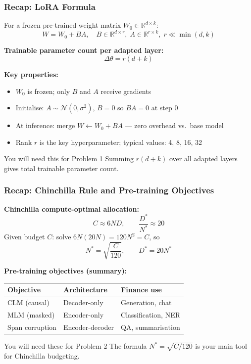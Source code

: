 \documentclass[9pt,t]{beamer}
\begin{document}
\begin{frame}
\frametitle{Recap: LoRA Formula}

For a frozen pre-trained weight matrix $W_0 \in \mathbb{R}^{d \times k}$:
\[
  W = W_0 + BA, \quad B \in \mathbb{R}^{d \times r},\; A \in \mathbb{R}^{r \times k},\;
  r \ll \min(d,k)
\]

\medskip
\textbf{Trainable parameter count per adapted layer:}
\[
  \Delta\theta = r(d + k)
\]

\medskip
\textbf{Key properties:}
\begin{itemize}
  \item $W_0$ is frozen; only $B$ and $A$ receive gradients
  \item Initialise: $A \sim \mathcal{N}(0, \sigma^2)$, $B = 0$ so $BA = 0$ at step 0
  \item At inference: merge $W \leftarrow W_0 + BA$ --- zero overhead vs.\ base model
  \item Rank $r$ is the key hyperparameter; typical values: 4, 8, 16, 32
\end{itemize}

\medskip
\begin{alertblock}{You will need this for Problem 1}
  Summing $r(d+k)$ over all adapted layers gives total trainable parameter count.
\end{alertblock}
\end{frame}

\begin{frame}
\frametitle{Recap: Chinchilla Rule and Pre-training Objectives}

\textbf{Chinchilla compute-optimal allocation:}
\[
  C \approx 6ND, \qquad \frac{D^*}{N^*} \approx 20
\]
Given budget $C$: solve $6N(20N) = 120N^2 = C$, so
\[
  N^* = \sqrt{\frac{C}{120}}, \qquad D^* = 20 N^*
\]

\medskip
\textbf{Pre-training objectives (summary):}

\begin{center}
\begin{tabular}{lll}
\toprule
\textbf{Objective} & \textbf{Architecture} & \textbf{Finance use} \\
\midrule
CLM (causal) & Decoder-only & Generation, chat \\
MLM (masked) & Encoder-only & Classification, NER \\
Span corruption & Encoder-decoder & QA, summarisation \\
\bottomrule
\end{tabular}
\end{center}

\medskip
\begin{alertblock}{You will need these for Problem 2}
  The formula $N^* = \sqrt{C/120}$ is your main tool for Chinchilla budgeting.
\end{alertblock}
\end{frame}
\end{document}
